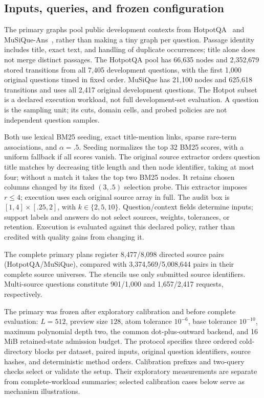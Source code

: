 \documentclass[conference]{IEEEtran}
\begin{document}
\subsection{Inputs, queries, and frozen configuration}
The primary graphs pool public development contexts from HotpotQA~\cite{hotpot} and MuSiQue-Ans~\cite{musique}, rather than making a tiny graph per question. Passage identity includes title, exact text, and handling of duplicate occurrences; title alone does not merge distinct passages. The HotpotQA pool has 66,635 nodes and 2,352,679 stored transitions from all 7,405 development questions, with the first 1,000 original questions timed in fixed order. MuSiQue has 21,100 nodes and 625,618 transitions and uses all 2,417 original development questions. The Hotpot subset is a declared execution workload, not full development-set evaluation. A question is the sampling unit; its cuts, domain cells, and probed policies are not independent question samples.

Both use lexical BM25 seeding, exact title-mention links, sparse rare-term associations, and $\alpha=.5$. Seeding normalizes the top 32 BM25 scores, with a uniform fallback if all scores vanish. The original source extractor orders question title matches by decreasing title length and then node identifier, taking at most four; without a match it takes the top two BM25 nodes. It retains chosen columns changed by its fixed $(3,.5)$ selection probe. This extractor imposes $r\leq4$; execution uses each original source array in full. The audit box is $[1,4]\times[.25,2]$, with $k\in\{2,5,10\}$. Question/context fields determine inputs; support labels and answers do not select sources, weights, tolerances, or retention. Execution is evaluated against this declared policy, rather than credited with quality gains from changing it.

The complete primary plans register 8,477/8,098 directed source pairs (HotpotQA/MuSiQue), compared with 3,374,569/5,008,644 pairs in their complete source universes. The stencils use only submitted source identifiers. Multi-source questions constitute 901/1,000 and 1,657/2,417 requests, respectively.

The primary was frozen after exploratory calibration and before complete evaluation: $L=512$, preview size $128$, atom tolerance $10^{-6}$, base tolerance $10^{-10}$, maximum polynomial depth two, the common dot-plus-outward backend, and 16\,MiB retained-state admission budget. The protocol specifies three ordered cold-directory blocks per dataset, paired inputs, original question identifiers, source hashes, and deterministic method orders. Calibration prefixes and two-query checks select or validate the setup. Their exploratory measurements are separate from complete-workload summaries; selected calibration cases below serve as mechanism illustrations.
\end{document}
